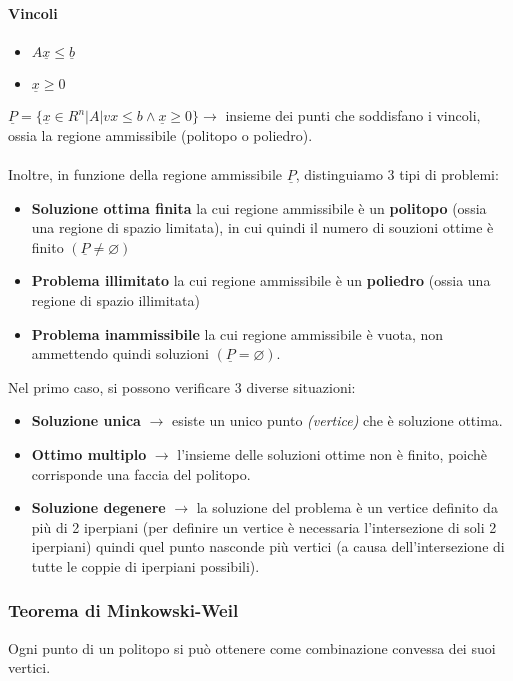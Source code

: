 \documentclass[12pt, twoside, letterpaper]{article}
\newcommand{\vx}[0]{
	\underline{x}
}
\begin{document}
				\paragraph{Vincoli} 
				\begin{itemize}
					\item $A \vx \leq \underline{b}$
					\item $\vx \geq 0$		
				\end{itemize}
				$\underline{P} = \{ \vx \in R^n | A |vx \leq b \land \vx \geq 0 \} \rightarrow$ insieme dei punti che soddisfano i vincoli, ossia la regione ammissibile (politopo o poliedro).\\\\
				Inoltre, in funzione della regione ammissibile $\underline{P}$, distinguiamo 3 tipi di problemi: 
				\begin{itemize}
					\item \textbf{Soluzione ottima finita} la cui regione ammissibile è un \textbf{politopo} (ossia una regione di spazio limitata), in cui quindi il numero di souzioni ottime è finito $(\underline{P} \ne \varnothing)$
					\item \textbf{Problema illimitato} la cui regione ammissibile è un \textbf{poliedro} (ossia una regione di spazio illimitata)
					\item \textbf{Problema inammissibile} la cui regione ammissibile è vuota, non ammettendo quindi soluzioni $(\underline{P} = \varnothing)$.
				\end{itemize}
				Nel primo caso, si possono verificare 3 diverse situazioni:
				\begin{itemize}
					\item \textbf{Soluzione unica} $\rightarrow$ esiste un unico punto \textit{(vertice)} che è soluzione ottima.
					\item \textbf{Ottimo multiplo} $\rightarrow$ l'insieme delle soluzioni ottime non è finito, poichè corrisponde una faccia del politopo. 
					\item \textbf{Soluzione degenere} $\rightarrow$ la soluzione  del problema è un vertice definito da più di 2 iperpiani (per definire un vertice è necessaria l'intersezione di soli 2 iperpiani) quindi quel punto nasconde più vertici (a causa dell'intersezione di tutte le coppie di iperpiani possibili).
				\end{itemize}
				
			\subsubsection{Teorema di Minkowski-Weil}
				Ogni punto di un politopo si può ottenere come combinazione convessa dei suoi vertici. 
\end{document}
